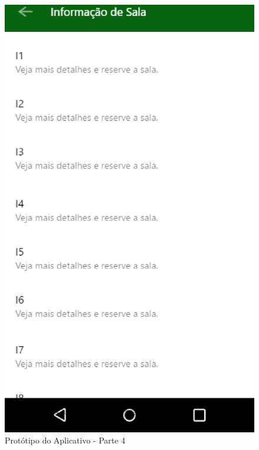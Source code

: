 \begin{anexosenv}
\begin{figure}[!h]
  \centering
  \includegraphics[keepaspectratio=true,scale=0.6]{figuras/prot-3.eps}
  \caption{Protótipo do Aplicativo - Parte 4}
\end{figure}


\end{anexosenv}
